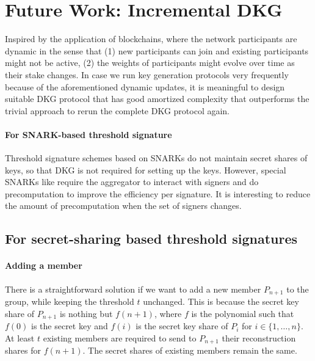 \section{Future Work: Incremental DKG} 

Inspired by the application of blockchains, where the network participants are dynamic in the sense that (1) new participants can join and existing participants might not be active, (2) the weights of participants might evolve over time as their stake changes. In case we run key generation protocols very frequently because of the aforementioned dynamic updates, it is meaningful to design suitable DKG protocol that has good amortized complexity that outperforms the trivial approach to rerun the complete DKG protocol again. 

\paragraph{For SNARK-based threshold signature} Threshold signature schemes based on SNARKs do not maintain secret shares of keys, so that DKG is not required for setting up the keys. However, special SNARKs like \cite{DBLP:conf/ccs/DasCXNB023} require the aggregator to interact with signers and do precomputation to improve the efficiency per signature. It is interesting to reduce the amount of precomputation when the set of signers changes. 

\subsection{For secret-sharing based threshold signatures} 

\paragraph{Adding a member} There is a straightforward solution if we want to add a new member $P_{n+1}$ to the group, while keeping the threshold $t$ unchanged. This is because the secret key share of $P_{n+1}$ is nothing but $f(n+1)$, where $f$ is the polynomial such that $f(0)$ is the secret key and $f(i)$ is the secret key share of $P_i$ for $i\in\{1,\dots, n\}$. At least $t$ existing members are required to send to $P_{n+1}$ their reconstruction shares for $f(n+1)$. The secret shares of existing members remain the same. 

